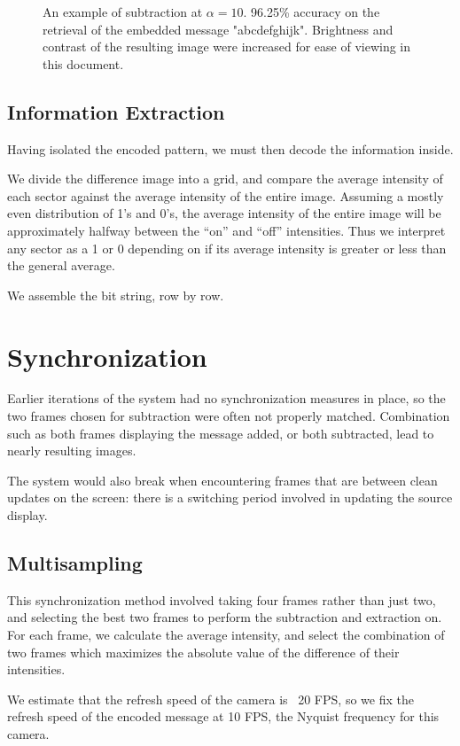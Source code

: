 \documentclass[11pt, letterpaper]{article}
\begin{document}
\begin{figure}[hbtp]
\caption{An example of subtraction at $\alpha = 10$. 96.25\% accuracy on the retrieval of the embedded message "abcdefghijk". Brightness and contrast of the resulting image were increased for ease of viewing in this document.}
\label{fig:subtract}
\end{figure}

\subsection{Information Extraction}
Having isolated the encoded pattern, we must then decode the information inside.

We divide the difference image into a grid, and compare the average intensity of each sector against the average intensity of the entire image.
Assuming a mostly even distribution of 1's and 0's, the average intensity of the entire image will be approximately halfway between the ``on'' and ``off'' intensities. Thus we interpret any sector as a 1 or 0 depending on if its average intensity is greater or less than the general average.

We assemble the bit string, row by row.

\section{Synchronization}
Earlier iterations of the system had no synchronization measures in place, so the two frames chosen for subtraction were often not properly matched.
Combination such as both frames displaying the message added, or both subtracted, lead to nearly resulting images.

The system would also break when encountering frames that are between clean updates on the screen: there is a switching period involved in updating the source display.

\subsection{Multisampling}
This synchronization method involved taking four frames rather than just two, and selecting the best two frames to perform the subtraction and extraction on.
For each frame, we calculate the average intensity, and select the combination of two frames which maximizes the absolute value of the difference of their intensities.

We estimate that the refresh speed of the camera is ~20 FPS, so we fix the refresh speed of the encoded message at 10 FPS, the Nyquist frequency for this camera.
\end{document}
